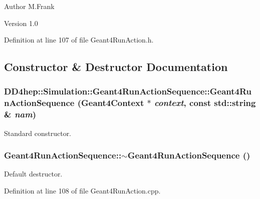 \begin{DoxyAuthor}{Author}
M.Frank 
\end{DoxyAuthor}
\begin{DoxyVersion}{Version}
1.0 
\end{DoxyVersion}


Definition at line 107 of file Geant4RunAction.h.

\subsection{Constructor \& Destructor Documentation}
\hypertarget{class_d_d4hep_1_1_simulation_1_1_geant4_run_action_sequence_a91f1971562561332f1a41e8e3492e602}{
\subsubsection[{Geant4RunActionSequence}]{\setlength{\rightskip}{0pt plus 5cm}DD4hep::Simulation::Geant4RunActionSequence::Geant4RunActionSequence ({\bf Geant4Context} $\ast$ {\em context}, \/  const std::string \& {\em nam})}}
\label{class_d_d4hep_1_1_simulation_1_1_geant4_run_action_sequence_a91f1971562561332f1a41e8e3492e602}


Standard constructor. \hypertarget{class_d_d4hep_1_1_simulation_1_1_geant4_run_action_sequence_a4489dd79f6a419c4788a73efd50f6024}{
\subsubsection[{$\sim$Geant4RunActionSequence}]{\setlength{\rightskip}{0pt plus 5cm}Geant4RunActionSequence::$\sim$Geant4RunActionSequence ()}}
\label{class_d_d4hep_1_1_simulation_1_1_geant4_run_action_sequence_a4489dd79f6a419c4788a73efd50f6024}


Default destructor. 

Definition at line 108 of file Geant4RunAction.cpp.

